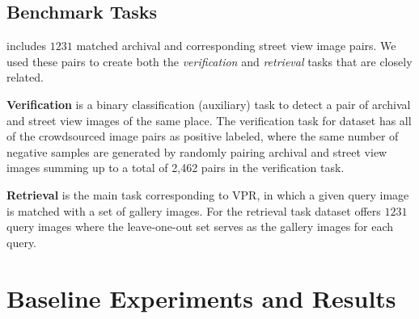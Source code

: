 \documentclass[a4paper,conference]{IEEEtran}
\begin{document}
\subsection{Benchmark Tasks}
\label{sub:tasks}
\amstertime  includes $1231$ matched archival and corresponding street view image pairs. We used these pairs to create both the {\textit{verification}} and {\textit{retrieval}} tasks that are closely related.

\textbf{Verification} is a binary classification (auxiliary) task to detect a pair of archival and street view images of the same place.  The verification task for \amstertime dataset has all of the crowdsourced image pairs as positive labeled, where the same number of negative samples are generated by randomly pairing archival and street view images summing up to a total of 2,462 pairs in the verification task.

\textbf{Retrieval} is the main task corresponding to VPR, in which a given query image is matched with a set of gallery images. For the retrieval task \amstertime dataset offers $1231$ query images where the leave-one-out set serves as the gallery images for each query.   \section{Baseline Experiments and Results}
\label{sec:experiments}
\end{document}
